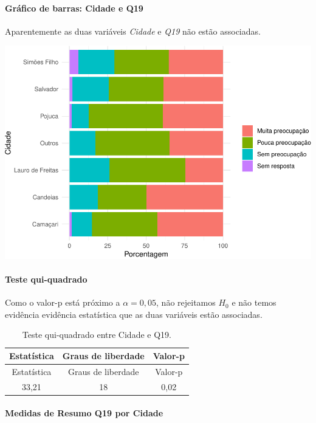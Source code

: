 \documentclass[]{article}
\let\oldparagraph\paragraph
\renewcommand{\paragraph}[1]{\oldparagraph{#1}\mbox{}}
\begin{document}
\hypertarget{gruxe1fico-de-barras-cidade-e-q19}{%
\paragraph{Gráfico de barras: Cidade e Q19}\label{gruxe1fico-de-barras-cidade-e-q19}}

Aparentemente as duas variáveis \emph{Cidade} e \emph{Q19} não estão associadas.

\begin{center}\includegraphics[width=0.75\linewidth]{relatorio_files/figure-latex/unnamed-chunk-251-1} \end{center}

\hypertarget{teste-qui-quadrado-27}{%
\paragraph{Teste qui-quadrado}\label{teste-qui-quadrado-27}}

Como o valor-p está próximo a \(\alpha=0,05\), não rejeitamos \(H_0\) e não temos evidência evidência estatística que as duas variáveis estão associadas.

\begin{longtable}[]{@{}ccc@{}}
\caption{\label{tab:unnamed-chunk-252}Teste qui-quadrado entre Cidade e Q19.}\tabularnewline
\toprule
Estatística & Graus de liberdade & Valor-p\tabularnewline
\midrule
\endfirsthead
\toprule
Estatística & Graus de liberdade & Valor-p\tabularnewline
\midrule
\endhead
33,21 & 18 & 0,02\tabularnewline
\bottomrule
\end{longtable}

\cleardoublepage

\hypertarget{medidas-de-resumo-q19-por-cidade}{%
\paragraph{Medidas de Resumo Q19 por Cidade}\label{medidas-de-resumo-q19-por-cidade}}
\end{document}
